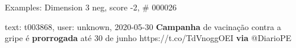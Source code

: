 \begin{frame}{Examples: Dimension 3 neg, score -2, \# 000026}
\footnotesize
\begin{alertblock}{text: t003868, user: unknown, 2020-05-30}
\textbf{Campanha} de vacinação contra a gripe é \textbf{prorrogada} até 30 de 
junho https://t.co/TdVnoggOEI \textbf{via} @DiarioPE 
\end{alertblock}
\end{frame}
